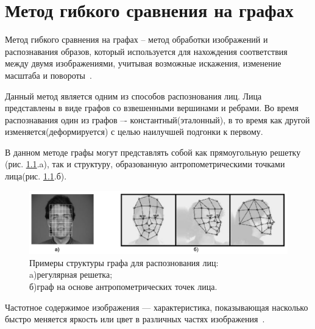 \chapter{Метод гибкого сравнения на графах}

Метод гибкого сравнения на графах -- метод обработки изображений и распознавания образов, который 
используется для нахождения соответствия между двумя изображениями, учитывая возможные искажения, изменение масштаба и повороты~\cite{distances}.

Данный метод является одним из способов распознования лиц.
Лица представлены в виде графов со взвешенными
вершинами и ребрами\cite{wen}. 
Во время распознавания один из графов –- константный(эталонный), 
в то время как другой изменяется(деформируется) с 
целью наилучшей подгонки к первому. 

В данном методе графы могут представлять собой как 
прямоугольную решетку (рис. \ref{img:ant}.a), так и структуру, образованную антропометрическими
точками лица(рис. \ref{img:ant}.б).

\begin{figure}[h]
    \centering
    \includegraphics[height=0.15\textheight]{img/ex.jpg}
    \caption{Примеры структуры графа для распознования лиц: \\ 
    a)регулярная решетка; \\ б)граф на основе антропометрических точек лица.}
    \label{img:ant}
\end{figure}

Частотное содержимое изображения --- характеристика, показывающая насколько быстро 
меняется яркость или цвет в различных частях изображения~\cite{chst}.

